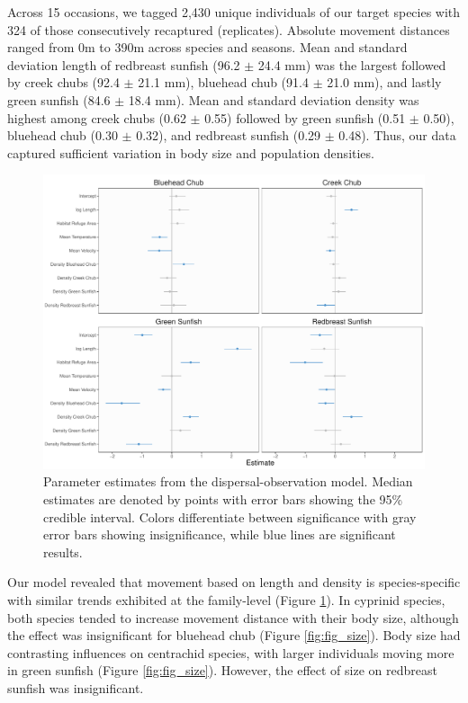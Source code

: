 \documentclass[11pt, class=article, crop=false]{standalone}
\begin{document}
Across 15 occasions, we tagged 2,430 unique individuals of our target species with 324 of those consecutively recaptured (replicates). Absolute movement distances ranged from 0m to 390m across species and seasons. Mean and standard deviation length of redbreast sunfish (96.2 $\pm$ 24.4 mm) was the largest followed by creek chubs (92.4 $\pm$ 21.1 mm), bluehead chub (91.4 $\pm$ 21.0 mm), and lastly green sunfish (84.6 $\pm$ 18.4 mm). Mean and standard deviation density was highest among creek chubs (0.62 $\pm$ 0.55) followed by green sunfish (0.51 $\pm$ 0.50), bluehead chub (0.30 $\pm$ 0.32), and redbreast sunfish (0.29 $\pm$ 0.48). Thus, our data captured sufficient variation in body size and population densities. 
\begin{figure}
    \centering
    \includegraphics[width=0.75\linewidth]{output/fig_est.pdf}
    \caption{Parameter estimates from the dispersal-observation model. Median estimates are denoted by points with error bars showing the 95\% credible interval. Colors differentiate between significance with gray error bars showing insignificance, while blue lines are significant results.}
    \label{fig:fig_est}
\end{figure}
Our model revealed that movement based on length and density is species-specific with similar trends exhibited at the family-level (Figure \ref{fig:fig_est}). In cyprinid species, both species tended to increase movement distance with their body size, although the effect was insignificant for bluehead chub (Figure \ref{fig:fig_size}). Body size had contrasting influences on centrachid species, with larger individuals moving more in green sunfish (Figure \ref{fig:fig_size}). However, the effect of size on redbreast sunfish was insignificant.
\end{document}
